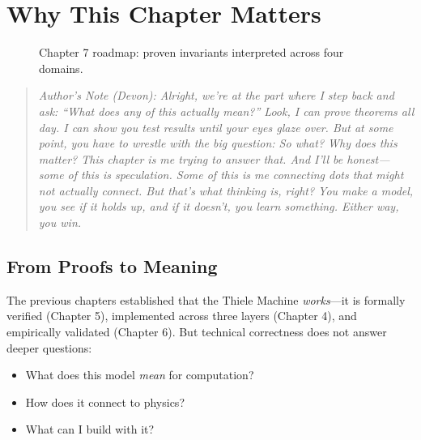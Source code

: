 \section{Why This Chapter Matters}

\begin{figure}[h]
\centering
{}
\caption{Chapter 7 roadmap: proven invariants interpreted across four domains.}
\label{fig:ch7-roadmap}
\end{figure}

\begin{quote}
\textit{Author's Note (Devon): Alright, we're at the part where I step back and ask: ``What does any of this actually mean?'' Look, I can prove theorems all day. I can show you test results until your eyes glaze over. But at some point, you have to wrestle with the big question: So what? Why does this matter? This chapter is me trying to answer that. And I'll be honest---some of this is speculation. Some of this is me connecting dots that might not actually connect. But that's what thinking is, right? You make a model, you see if it holds up, and if it doesn't, you learn something. Either way, you win.}
\end{quote}

\subsection{From Proofs to Meaning}

The previous chapters established that the Thiele Machine \textit{works}---it is formally verified (Chapter 5), implemented across three layers (Chapter 4), and empirically validated (Chapter 6). But technical correctness does not answer deeper questions:
\begin{itemize}
    \item What does this model \textit{mean} for computation?
    \item How does it connect to physics?
    \item What can I build with it?
\end{itemize}

